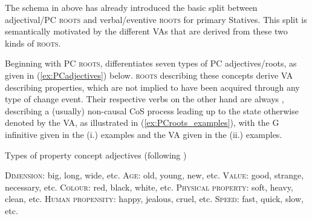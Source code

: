 \documentclass[output=paper,colorlinks,citecolor=brown]{langscibook}
\begin{document}
The schema in  above has already introduced the basic split between adjectival/PC \textsc{roots} and verbal/eventive \textsc{roots} for primary Statives.  This split is semantically motivated by the different VAs that are derived from these two kinds of \textsc{roots}. 

Beginning with PC \textsc{roots}, \citet[3f.]{Dixon1982} differentiates seven types of PC adjectives/roots, as given in (\ref{ex:PCadjectives}) below. \textsc{roots} describing these concepts derive VA describing  properties, which are not implied to have been acquired through any type of change event. Their respective verbs on the other hand are always , describing a (usually) non-causal CoS  process leading up to the state otherwise denoted by the VA, as illustrated in (\ref{ex:PCroots_examples}), with the G infinitive given in the (i.) examples and the VA given in the (ii.) examples.

\begin{exe}  \ex Types of property concept adjectives (following \cite[3f.]{Dixon1982})\label{ex:PCadjectives}
\begin{xlist}
    \ex    \textsc{Dimension}: {big}, {long}, {wide}, etc.
    \ex \textsc{Age}: {old}, {young}, {new}, etc.
    \ex \textsc{Value}: {good}, {strange}, {necessary}, etc.
    \ex \textsc{Colour}: {red}, {black}, {white}, etc.
    \ex \textsc{Physical property}: {soft}, {heavy}, {clean}, etc.
    \ex \textsc{Human propensity}: {happy}, {jealous}, {cruel}, etc.
    \ex \textsc{Speed}: {fast}, {quick}, {slow}, etc.
\end{xlist}
\end{exe} 
\end{document}
